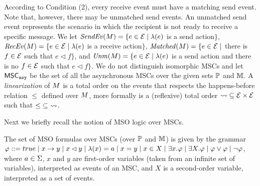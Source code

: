 According to Condition (2), every receive event must have a matching send event. Note that, however, there may be unmatched send events. An unmatched send event represents the scenario in which the recipient is not ready to receive a specific message.
We let
$\mathit{SendEv}(M) = \{e \in \mathcal{E} \mid \lambda(e)$ is a send
action$\}$,
$\mathit{RecEv}(M) = \{e \in \mathcal{E} \mid \lambda(e)$ is a receive
action$\}$,
$\mathit{Matched}(M) = \{e \in \mathcal{E} \mid$ there is $f \in \mathcal{E}$
such that $e \lhd f\}$, and
$\mathit{Unm}(M) = \{e \in \mathcal{E} \mid \lambda(e)$ is a send
action and there is no $f \in \mathcal{E}$ such that $e \lhd f\}$.
%
We do not distinguish isomorphic MSCs and
let $\mathsf{MSC}_{\mathtt{asy}}$ be the set of all the asynchronous MSCs over the given sets $\mathbb{P}$ and $\mathbb{M}$. 
%
%
%
A \emph{linearization} of $M$ is a total order on the events that respects the happens-before relation $\le$ defined over $M$, more formally is a (reflexive) total order ${\rightsquigarrow} \subseteq \mathcal{E} \times \mathcal{E}$ such that ${\le} \subseteq {\rightsquigarrow}$. 

Next we briefly recall the notion of MSO logic over MSCs.

\begin{definition}
The set of MSO formulas over MSCs (over $\mathbb{P}$ and $\mathbb{M}$) is given by the grammar
$
\varphi ::= true \mid x \to y \mid x \lhd y \mid \lambda(x) = a \mid x = y \mid x \in X \mid \exists x.\varphi \mid \exists X.\varphi \mid \varphi \vee \varphi \mid \neg \varphi
$,
where $a \in \Sigma$, $x$ and $y$ are first-order variables (taken from an infinite set of variables), interpreted as
events of an MSC, and $X$ is a second-order variable, interpreted
as a set of events. 
\end{definition}

